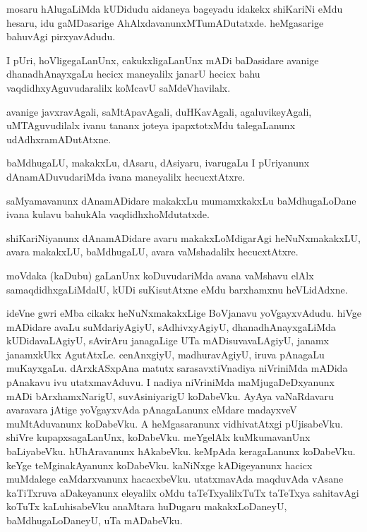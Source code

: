 \begin{mng}
mosaru hAlugaLiMda kUDidudu aidaneya bageyadu idakekx shiKariNi eMdu hesaru, idu gaMDasarige AhAlxdavanunxMTumADutatxde. heMgasarige bahuvAgi pirxyavAdudu.
\end{mng}

\begin{mng}
I pUri, hoVligegaLanUnx, cakukxligaLanUnx mADi baDasidare avanige dhanadhAnayxgaLu hecicx maneyalilx janarU hecicx bahu vaqdidhxyAguvudaralilx koMcavU saMdeVhavilalx.
\end{mng}

\begin{mng}
avanige javxravAgali, saMtApavAgali, duHKavAgali, agaluvikeyAgali, uMTAguvudilalx ivanu tananx joteya ipapxtotxMdu talegaLanunx udAdhxramADutAtxne.
\end{mng}

\begin{mng}
baMdhugaLU, makakxLu, dAsaru, dAsiyaru, ivarugaLu I pUriyanunx dAnamADuvudariMda ivana maneyalilx hecucxtAtxre.
\end{mng}

\begin{mng}
saMyamavanunx dAnamADidare makakxLu mumamxkakxLu baMdhugaLoDane ivana kulavu bahukAla vaqdidhxhoMdutatxde.
\end{mng}

\begin{mng}
shiKariNiyanunx dAnamADidare avaru makakxLoMdigarAgi heNuNxmakakxLU, avara makakxLU, baMdhugaLU, avara vaMshadalilx hecucxtAtxre.
\end{mng}

\begin{mng}
moVdaka (kaDubu) gaLanUnx koDuvudariMda avana vaMshavu elAlx samaqdidhxgaLiMdalU, kUDi suKisutAtxne eMdu barxhamxnu heVLidAdxne.
\end{mng}

\begin{mng}
ideVne gwri eMba cikakx heNuNxmakakxLige BoVjanavu yoVgayxvAdudu. hiVge mADidare avaLu suMdariyAgiyU, sAdhivxyAgiyU, dhanadhAnayxgaLiMda kUDidavaLAgiyU, sAvirAru janagaLige UTa mADisuvavaLAgiyU, janamx janamxkUkx AgutAtxLe. cenAnxgiyU, madhuravAgiyU, iruva pAnagaLu muKayxgaLu. dArxkASxpAna matutx sarasavxtiVnadiya niVriniMda mADida pAnakavu ivu utatxmavAduvu. I nadiya niVriniMda maMjugaDeDxyanunx mADi bArxhamxNarigU, suvAsiniyarigU koDabeVku. AyAya vaNaRdavaru avaravara jAtige yoVgayxvAda pAnagaLanunx eMdare madayxveV muMtAduvanunx koDabeVku. A heMgasaranunx vidhivatAtxgi pUjisabeVku. shiVre kupapxsagaLanUnx, koDabeVku. meYgelAlx kuMkumavanUnx baLiyabeVku. hUhAravanunx hAkabeVku. keMpAda keragaLanunx koDabeVku. keYge teMginakAyanunx koDabeVku. kaNiNxge kADigeyanunx hacicx muMdalege caMdarxvanunx hacacxbeVku. utatxmavAda maqduvAda vAsane kaTiTxruva aDakeyanunx eleyalilx oMdu taTeTxyalilxTuTx taTeTxya sahitavAgi koTuTx kaLuhisabeVku anaMtara huDugaru makakxLoDaneyU, baMdhugaLoDaneyU, uTa mADabeVku.
\end{mng}

